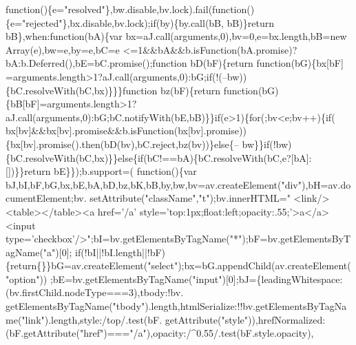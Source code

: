 \begin{DoxyCode}
{      function}()\{e=\textcolor{stringliteral}{"resolved"}\},bw.disable,bv.lock).fail(\textcolor{keyword}{function}()\{e=\textcolor{stringliteral}{"rejected"}\},bx.disable,bv.lock);\textcolor{keywordflow}{if}(by)\{by.call(bB,
      bB)\}\textcolor{keywordflow}{return} bB\},when:\textcolor{keyword}{function}(bA)\{var bx=aJ.call(arguments,0),bv=0,e=bx.length,bB=\textcolor{keyword}{new} Array(e),bw=e,by=e,bC=e
      <=1&&bA&&b.isFunction(bA.promise)?bA:b.Deferred(),bE=bC.promise();\textcolor{keyword}{function} bD(bF)\{\textcolor{keywordflow}{return} \textcolor{keyword}{function}(bG)\{bx[bF]
      =arguments.length>1?aJ.call(arguments,0):bG;\textcolor{keywordflow}{if}(!(--bw))\{bC.resolveWith(bC,bx)\}\}\}\textcolor{keyword}{function} bz(bF)\{\textcolor{keywordflow}{return} \textcolor{keyword}{
      function}(bG)\{bB[bF]=arguments.length>1?aJ.call(arguments,0):bG;bC.notifyWith(bE,bB)\}\}\textcolor{keywordflow}{if}(e>1)\{\textcolor{keywordflow}{for}(;bv<e;bv++)\{\textcolor{keywordflow}{if}(
      bx[bv]&&bx[bv].promise&&b.isFunction(bx[bv].promise))\{bx[bv].promise().then(bD(bv),bC.reject,bz(bv))\}\textcolor{keywordflow}{else}\{--
      bw\}\}\textcolor{keywordflow}{if}(!bw)\{bC.resolveWith(bC,bx)\}\}\textcolor{keywordflow}{else}\{\textcolor{keywordflow}{if}(bC!==bA)\{bC.resolveWith(bC,e?[bA]:[])\}\}\textcolor{keywordflow}{return} bE\}\});b.support=(\textcolor{keyword}{
      function}()\{var bJ,bI,bF,bG,bx,bE,bA,bD,bz,bK,bB,by,bw,bv=av.createElement(\textcolor{stringliteral}{"div"}),bH=av.documentElement;bv.
      setAttribute(\textcolor{stringliteral}{"className"},\textcolor{stringliteral}{"t"});bv.innerHTML=\textcolor{stringliteral}{"   <link/><table></table><a href='/a'
       style='top:1px;float:left;opacity:.55;'>a</a><input type='checkbox'/>"};bI=bv.getElementsByTagName(\textcolor{stringliteral}{"*"});bF=bv.getElementsByTagName(\textcolor{stringliteral}{"a"})[0];\textcolor{keywordflow}{
      if}(!bI||!bI.length||!bF)\{\textcolor{keywordflow}{return}\{\}\}bG=av.createElement(\textcolor{stringliteral}{"select"});bx=bG.appendChild(av.createElement(\textcolor{stringliteral}{"option"}))
      ;bE=bv.getElementsByTagName(\textcolor{stringliteral}{"input"})[0];bJ=\{leadingWhitespace:(bv.firstChild.nodeType===3),tbody:!bv.
      getElementsByTagName(\textcolor{stringliteral}{"tbody"}).length,htmlSerialize:!!bv.getElementsByTagName(\textcolor{stringliteral}{"link"}).length,style:/top/.test(bF.
      getAttribute(\textcolor{stringliteral}{"style"})),hrefNormalized:(bF.getAttribute(\textcolor{stringliteral}{"href"})===\textcolor{stringliteral}{"/a"}),opacity:/^0.55/.test(bF.style.opacity),

\end{DoxyCode}
